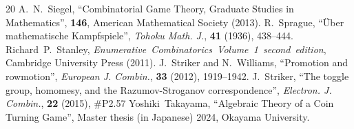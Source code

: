 \documentclass[a4paper,11pt]{amsart}
\theoremstyle{definition}
\numberwithin{equation}{section}
\begin{document}
\begin{thebibliography}{20}
%
A.~N.~Siegel, 
``Combinatorial Game Theory, Graduate Studies in Mathematics'', 
{\bf 146}, American Mathematical Society (2013).
%
R.~Sprague,
``\"Uber mathematische Kampfspiele'',
{\em Tohoku Math. J.}, {\bf 41} (1936), 438--444.
%
		{Richard~P.~Stanley}, 
		{\em Enumerative~Combinatorics~Volume~1~second~edition}, 
		{Cambridge University Press}
		(2011).
%
J.~Striker and N.~Williams,
``Promotion and rowmotion'', {\em European J. Combin.}, {\bf 33} (2012),
1919--1942.
%
J.~Striker,
``The toggle group, homomesy, and the
Razumov-Stroganov correspondence'',
{\em Electron. J. Combin.}, {\bf 22} (2015), \#P2.57
%
Yoshiki~Takayama,
``Algebraic Theory of a Coin Turning Game'',
Master thesis (in Japanese) 2024, Okayama University.
%
\end{thebibliography}
\end{document}
